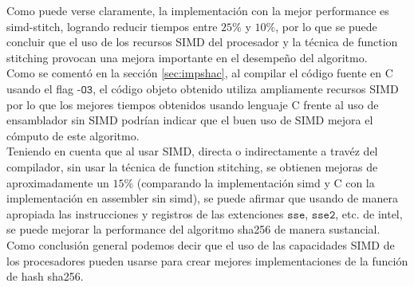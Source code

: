 Como puede verse claramente, la implementación con la mejor performance es simd-stitch, logrando reducir tiempos entre $25\%$ y $10\%$, por lo que se puede concluir que el uso de los recursos SIMD del procesador y la técnica de function stitching provocan una mejora importante en el desempeño del algoritmo. \\
\indent Como se comentó en la sección \ref{sec:impshac}, al compilar el código fuente en C usando el flag $\texttt{-O3}$, el código objeto obtenido utiliza ampliamente recursos SIMD por lo que los mejores tiempos obtenidos usando lenguaje C frente al uso de ensamblador sin SIMD podrían indicar que el buen uso de SIMD mejora el cómputo de este algoritmo. \\ \indent Teniendo en cuenta que al usar SIMD, directa o indirectamente a travéz del compilador, sin usar la técnica de function stitching, se obtienen mejoras de aproximadamente un $15\%$ (comparando la implementación simd y C con la implementación en assembler sin simd), se puede afirmar que usando de manera apropiada las instrucciones y registros de las extenciones $\texttt{sse}$, $\texttt{sse2}$, etc. de intel, se puede mejorar la performance del algoritmo sha256 de manera sustancial.\\
\indent Como conclusión general podemos decir que el uso de las capacidades SIMD de los procesadores pueden usarse para crear mejores implementaciones de la función de hash sha256.

